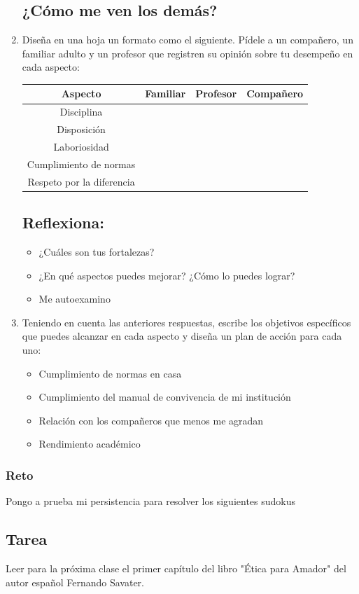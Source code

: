 \documentclass[10pt,twoside]{article}
\begin{document}
\begin{enumerate}
\subsection*{¿C\'{o}mo me ven los dem\'{a}s?}
\item Diseña en una hoja un formato como el siguiente. Pídele a un compañero, un familiar adulto y un profesor que registren su opinión sobre tu desempeño en cada aspecto:
\begin{center}
\begin{tabular}{|c|c|c|c|}
\hline 
\textbf{Aspecto} & \textbf{Familiar} & \textbf{Profesor} & \textbf{Compañero} \\ 
\hline 
Disciplina &  &  &  \\ 
\hline 
Disposición &  &  &  \\ 
\hline 
Laboriosidad &  &  &  \\ 
\hline 
Cumplimiento de normas &  &  &  \\ 
\hline 
Respeto por la diferencia &  &  &  \\ 
\hline 
\end{tabular} 
\end{center}
\subsection*{Reflexiona:}
\begin{itemize}
\item ¿Cuáles son tus fortalezas?
\item ¿En qué aspectos puedes mejorar? ¿Cómo lo puedes lograr?
\item Me autoexamino
\end{itemize}
\item Teniendo en cuenta las anteriores respuestas, escribe los objetivos específicos que puedes alcanzar en cada aspecto y diseña un plan de acción para cada uno:
\begin{itemize}
\item Cumplimiento de normas en casa
\item Cumplimiento del manual de convivencia de mi institución
\item Relación con los compañeros que menos me agradan
\item Rendimiento académico
\end{itemize}
\end{enumerate}
\subsubsection*{Reto}
Pongo a prueba mi persistencia para resolver los siguientes sudokus

\begin{minipage}{.45\textwidth}

\end{minipage}\hfill
\begin{minipage}{.45\textwidth}

\end{minipage}
\subsection*{Tarea}
Leer para la pr\'{o}xima clase el primer cap\'{i}tulo del libro "\'{E}tica para Amador" del autor español Fernando Savater.
\end{document}
